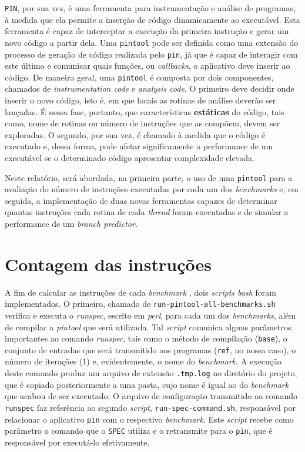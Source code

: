 \documentclass[12pt]{article}
\begin{document}
\texttt{PIN}, por sua vez, é uma ferramenta para instrumentação e análise de
programas, à medida que ela permite a inserção de código dinamicamente ao
executável. Esta ferramenta é capaz de interceptar a execução da primeira
instrução e gerar um novo código a partir dela. Uma \texttt{pintool} pode ser
definida como uma extensão do processo de geração de código realizada pelo
\texttt{pin}, já que é capaz de interagir com este último e comunicar quais
funções, ou \textit{callbacks}, o aplicativo deve inserir ao código. De maneira
geral, uma \texttt{pintool} é composta por dois componentes, chamados de
\textit{instrumentation code} e \textit{analysis code}. O primeiro deve decidir
onde inserir o novo código, isto é, em que locais as rotinas de análise deverão
ser lançadas. É nessa fase, portanto, que características \textbf{estáticas} do
código, tais como, nome de rotinas ou número de instruções que as
compõem, devem ser exploradas. O segundo, por sua vez, é chamado à medida que o
código é executado e, dessa forma, pode afetar significamente a performance de
um executável se o determinado código apresentar complexidade elevada. 

Neste relatório, será abordada, na primeira parte, o uso de uma \texttt{pintool}
para a avaliação do número de instruções executadas por cada um dos
\textit{benchmarks} e, em seguida, a implementação de duas novas ferramentas
capazes de determinar quantas instruções cada rotina de cada \textit{thread}
foram executadas e de simular a performance de um \textit{branch predictor}.

\section{Contagem das instruções} \label{sec:count}


A fim de calcular as instruções de cada \textit{benchmark} , dois
\textit{scripts bash} foram implementados. O primeiro, chamado de
\texttt{run-pintool-all-benchmarks.sh} verifica e executa o \textit{runspec},
escrito em \textit{perl}, para cada um dos \textit{benchmarks}, além de compilar
a \textit{pintool} que será utilizada. Tal \textit{script} comunica alguns
parâmetros importantes ao comando \textit{runspec}, tais como o método de
compilação (\texttt{base}), o conjunto de entradas que será transmitido aos
programas (\texttt{ref}, no nossa caso), o número de iterações (1) e,
evidentemente, o nome do \textit{benchmark}. A execução deste comando produz um
arquivo de extensão \texttt{.tmp.log} no diretório do projeto, que é copiado
posteriormente a uma pasta, cujo nome é igual ao do \textit{benchmark} que
acabou de ser executado. O arquivo de configuração transmitido ao comando
\texttt{runspec} faz referência ao segundo \textit{script},
\texttt{run-spec-command.sh}, responsável por relacionar o aplicativo
\texttt{pin} com o respectivo \textit{benchmark}. Este \textit{script} recebe
como parâmetro o comando que o \texttt{SPEC} utiliza e o retransmite para o
\texttt{pin}, que é responsável por executá-lo efetivamente.
\end{document}
